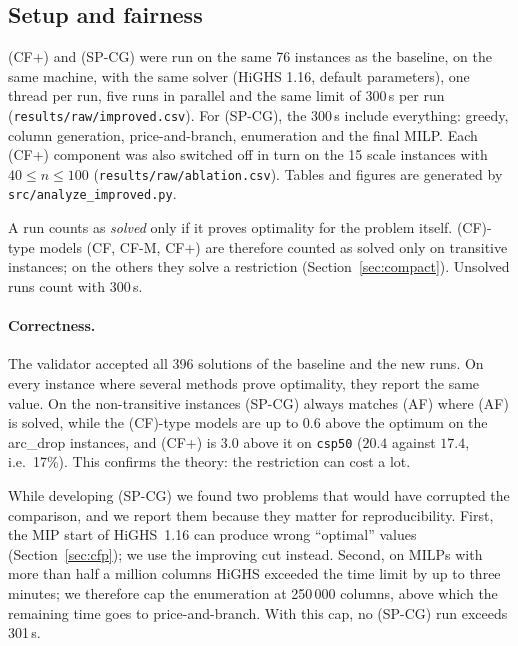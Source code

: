 
\subsection{Setup and fairness}

(CF+) and (SP-CG) were run on the same 76 instances as the baseline, on the
same machine, with the same solver (HiGHS 1.16, default parameters), one
thread per run, five runs in parallel and the same limit of 300\,s per run
(\texttt{results/raw/improved.csv}). For (SP-CG), the 300\,s include
everything: greedy, column generation, price-and-branch, enumeration and the
final MILP. Each (CF+) component was also switched off in turn on the 15
scale instances with $40\le n\le100$ (\texttt{results/raw/ablation.csv}).
Tables and figures are generated by \texttt{src/analyze\_improved.py}.

A run counts as \emph{solved} only if it proves optimality for the problem
itself. (CF)-type models (CF, CF-M, CF+) are therefore counted as solved only
on transitive instances; on the others they solve a restriction
(Section~\ref{sec:compact}). Unsolved runs count with 300\,s.

\paragraph{Correctness.} The validator accepted all 396 solutions of the
baseline and the new runs. On every instance where several methods prove
optimality, they report the same value. On the non-transitive instances
(SP-CG) always matches (AF) where (AF) is solved, while the (CF)-type
models are up to $0.6$ above the optimum on the arc\_drop instances, and
(CF+) is $3.0$ above it on \texttt{csp50} ($20.4$ against $17.4$, i.e.\ 17\%).
This confirms the theory: the restriction can cost a lot.

While developing (SP-CG) we found two problems that would have corrupted the
comparison, and we report them because they matter for reproducibility.
First, the MIP start of HiGHS~1.16 can produce wrong ``optimal'' values
(Section~\ref{sec:cfp}); we use the improving cut instead. Second, on MILPs
with more than half a million columns HiGHS exceeded the time limit by up to
three minutes; we therefore cap the enumeration at 250\,000 columns, above
which the remaining time goes to price-and-branch. With this cap, no
(SP-CG) run exceeds 301\,s.

